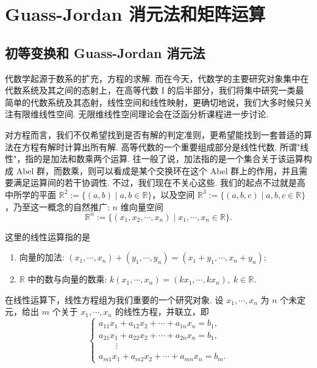 \documentclass[10pt,openany]{article}
\theoremstyle{thmstyle} %
\theoremstyle{defstyle} %
\theoremstyle{prostyle} %
\theoremstyle{exastyle}
\theoremstyle{remstyle}
\begin{document}
\pagestyle{fancy}
\rhead{\today}

\section{Guass-Jordan 消元法和矩阵运算}
\subsection{初等变换和 Guass-Jordan 消元法}
\label{1.1}
代数学起源于数系的扩充，方程的求解. 而在今天，代数学的主要研究对象集中在代数系统及其之间的态射上，在高等代数 I 的后半部分，我们将集中研究一类最简单的代数系统及其态射，线性空间和线性映射，更确切地说，我们大多时候只关注有限维线性空间. 无限维线性空间理论会在泛函分析课程进一步讨论.

对方程而言，我们不仅希望找到是否有解的判定准则，更希望能找到一套普适的算法在方程有解时计算出所有解. 高等代数的一个重要组成部分是线性代数. 所谓"线性"，指的是加法和数乘两个运算. 往一般了说，加法指的是一个集合关于该运算构成 Abel 群，而数乘，则可以看成是某个交换环在这个 Abel 群上的作用，并且需要满足运算间的若干协调性. 不过，我们现在不关心这些. 我们的起点不过就是高中所学的平面 \( \mathbb{R}^2:=\{(a,b) \mid a,b \in \mathbb{R} \} \)，以及空间 \( \mathbb{R}^3:=\{ (a,b,c) \mid a,b,c \in \mathbb{R} \} \)，乃至这一概念的自然推广: \( n \) 维向量空间
\[ \mathbb{R}^n:=\{ (x_1,x_2,\cdots,x_n) \mid x_1,\cdots,x_n \in \mathbb{R} \}. \]

这里的线性运算指的是
\begin{enumerate}[(1)]
	\item 向量的加法: \( (x_1,\cdots,x_n)+(y_1,\cdots,y_n)=(x_1+y_1,\cdots,x_n+y_n) \);
	\item \( \mathbb{R} \) 中的数与向量的数乘: \( k(x_1,\cdots,x_n)=(kx_1,\cdots,kx_n), \; k \in \mathbb{R} \).
\end{enumerate} 

在线性运算下，线性方程组为我们重要的一个研究对象. 设 \( x_1,\cdots,x_n \) 为 \( n \) 个未定元，给出 \( m \) 个关于 \( x_1,\cdots,x_n \) 的线性方程，并联立，即
\begin{equation}
	\left\{\begin{array}{l}
		a_{11}x_1+a_{12}x_2+\cdots+a_{1n}x_n=b_1, \\
		a_{21}x_1+a_{22}x_2+\cdots+a_{2n}x_n=b_1, \\
		\qquad \vdots \\
		a_{m1}x_1+a_{m2}x_2+\cdots+a_{mn}x_n=b_m.
	\end{array}\right.
	\label{linequ.}
\end{equation}
\end{document}
